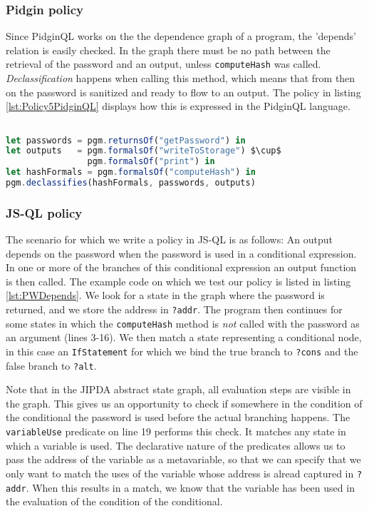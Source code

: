 \subsubsection*{Pidgin policy}

Since PidginQL works on the the dependence graph of a program, the 'depends' relation is easily checked. In the graph there must be no path between the retrieval of the password and an output, unless \texttt{computeHash} was called. \textit{Declassification} happens when calling this method, which means that from then on the password is sanitized and ready to flow to an output. The policy in listing \ref{lst:Policy5PidginQL} displays how this is expressed in the PidginQL language.

\begin{lstlisting}[label={lst:Policy5PidginQL},language=JavaScript,caption=Policy 5 in PidginQL,mathescape=true]  % float=t?

let passwords = pgm.returnsOf("getPassword") in 
let outputs   = pgm.formalsOf("writeToStorage") $\cup$
                pgm.formalsOf("print") in
let hashFormals = pgm.formalsOf("computeHash") in
pgm.declassifies(hashFormals, passwords, outputs)
\end{lstlisting}

\subsubsection*{JS-QL policy}

The scenario for which we write a policy in JS-QL is as follows: An output depends on the password when the password is used in a conditional expression. In one or more of the branches of this conditional expression an output function is then called. The example code on which we test our policy is listed in listing \ref{lst:PWDepends}. We look for a state in the graph where the password is returned, and we store the address in \texttt{?addr}. The program then continues for some states in which the \texttt{computeHash} method is \textit{not} called with the password as an argument (lines 3-16). We then match a state representing a conditional node, in this case an \texttt{IfStatement} for which we bind the true branch to \texttt{?cons} and the false branch to \texttt{?alt}. 

Note that in the JIPDA abstract state graph, all evaluation steps are visible in the graph. This gives us an opportunity to check if somewhere in the condition of the conditional the password is used before the actual branching happens. The \texttt{variableUse} predicate on line 19 performs this check. It matches any state in which a variable is used. The declarative nature of the predicates allows us to pass the address of the variable as a metavariable, so that we can specify that we only want to match the uses of the variable whose address is alread captured in \texttt{?addr}. When this results in a match, we know that the variable has been used in the evaluation of the condition of the conditional. 

